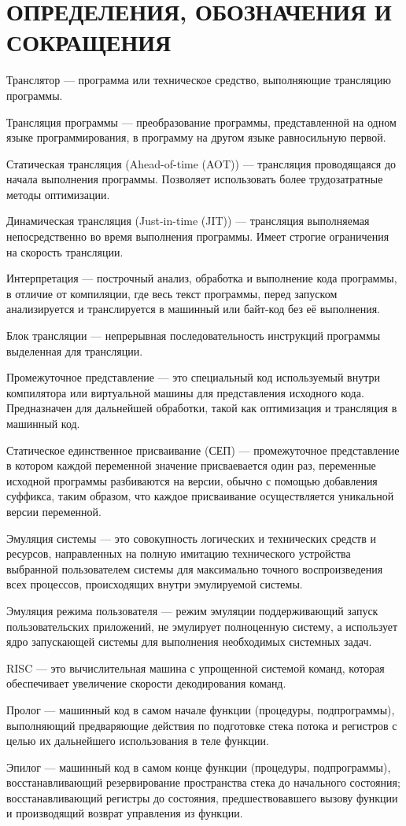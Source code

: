 \section*{ОПРЕДЕЛЕНИЯ, ОБОЗНАЧЕНИЯ И СОКРАЩЕНИЯ}

Транслятор --- программа или техническое средство, выполняющие трансляцию программы. \cite{translate}

Трансляция программы --- преобразование программы, представленной на одном языке программирования, в программу на другом языке равносильную первой. \cite{translate}

Статическая трансляция (Ahead-of-time (AOT)) --- трансляция проводящаяся до начала выполнения программы. Позволяет использовать более трудозатратные методы оптимизации.

Динамическая трансляция (Just-in-time (JIT)) --- трансляция выполняемая непосредственно во время выполнения программы. Имеет строгие ограничения на скорость трансляции.

Интерпретация --- построчный анализ, обработка и выполнение кода программы, в отличие от компиляции, где весь текст программы, перед запуском анализируется и транслируется в машинный или байт-код без её выполнения. \cite{interpret}

Блок трансляции --- непрерывная последовательность инструкций программы выделенная для трансляции.

Промежуточное представление ---  это специальный код используемый внутри компилятора или виртуальной машины для представления исходного кода. Предназначен для дальнейшей обработки, такой как оптимизация и трансляция в машинный код.

Статическое единственное присваивание (СЕП) --- промежуточное представление в котором каждой переменной значение присваевается один раз, переменные исходной программы разбиваются на версии, обычно с помощью добавления суффикса, таким образом, что каждое присваивание осуществляется уникальной версии переменной.

Эмуляция системы --- это совокупность логических и технических средств и ресурсов, направленных на полную имитацию технического устройства выбранной пользователем системы для максимально точного воспроизведения всех процессов, происходящих внутри эмулируемой системы. 

Эмуляция режима пользователя --- режим эмуляции поддерживающий запуск пользовательских приложений, не эмулирует полноценную систему, а использует ядро запускающей системы для выполнения необходимых системных задач.

RISC --- это вычислительная машина с упрощенной системой команд, которая обеспечивает увеличение скорости декодирования команд. \cite{it_dict}

Пролог --- машинный код в самом начале функции (процедуры, подпрограммы), выполняющий предваряющие действия по подготовке стека потока и регистров с целью их дальнейшего использования в теле функции.

Эпилог --- машинный код в самом конце функции (процедуры, подпрограммы), восстанавливающий резервирование пространства стека до начального состояния; восстанавливающий регистры до состояния, предшествовавшего вызову функции и производящий возврат управления из функции.

\pagebreak